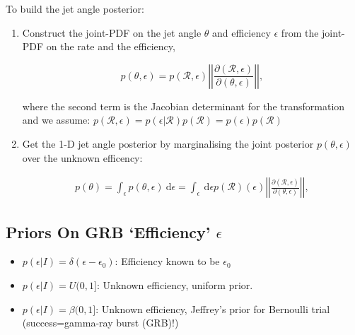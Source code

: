 \documentclass[a0,landscape]{a0poster}
\newcommand{\grbrate}{{{\mathcal R}_{\mathrm{grb}}}}
\newcommand{\cbcrate}{{{\mathcal R}}}
\newcommand{\diff}{{\mathrm d}}
\def\grb#1{gamma-ray burst#1 (GRB#1)\gdef\grb{GRB}}
\begin{document}
\begin{multicols}{4}
To build the jet angle posterior:
\begin{enumerate}
    \item Construct the joint-PDF on the jet angle $\theta$ and efficiency
        $\epsilon$ from the joint-PDF on the rate and the efficiency,

    \begin{equation}
    p(\theta,\epsilon) = p(\cbcrate,\epsilon)
    \left\lvert\left\lvert
    \frac{\partial(\cbcrate,\epsilon)}{\partial(\theta,\epsilon)}
    \right\rvert\right\rvert,
    \end{equation}

    where the second term is the Jacobian determinant for the transformation and
    we assume:
        $p(\cbcrate, \epsilon) =  p(\epsilon|\cbcrate)p(\cbcrate) =
        p(\epsilon)p(\cbcrate)$

    \item Get the 1-D jet angle posterior by marginalising the joint
        posterior $p(\theta,\epsilon)$ over the unknown efficency:

        \begin{eqnarray}\label{eq:transformationmarginalisation}
        p(\theta) = \int_{\epsilon} p(\theta,\epsilon)~\diff \epsilon =
        \int_{\epsilon} ~\diff \epsilon p(\cbcrate)(\epsilon)
            \left\lvert\left\lvert
            \frac{\partial(\cbcrate,\epsilon)}{\partial(\theta,\epsilon)}
            \right\rvert\right\rvert,
        \end{eqnarray}

\end{enumerate}

\subsection*{Priors On GRB `Efficiency' $\epsilon$}
\begin{itemize}
    \item $p(\epsilon|I) = \delta(\epsilon-\epsilon_0)$: Efficiency known to be
        $\epsilon_0$
    \item $p(\epsilon|I) = U(0,1]$: Unknown efficiency, uniform prior.
    \item $p(\epsilon|I) = \beta(0,1]$: Unknown efficiency, Jeffrey's prior for
        Bernoulli trial (success=\grb{}!)
\end{itemize}


\end{multicols}
\end{document}
